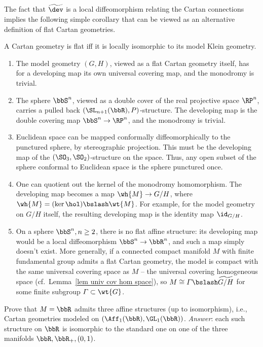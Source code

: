 The fact that $\widetilde{\dev}$ is a local diffeomorphism relating the Cartan connections implies the following simple corollary that can be viewed as an alternative definition of flat Cartan geometries.

\begin{cor}
    A Cartan geometry is flat iff it is locally isomorphic to its model Klein geometry.
\end{cor}

\begin{example}
    \begin{enumerate}
        \item The model geometry $(G,H)$, viewed as a flat Cartan geometry itself, has for a developing map its own universal covering map, and the monodromy is trivial.
        \item The sphere $\bbS^n$, viewed as a double cover of the real projective space $\RP^n$, carries a pulled back $(\SL_{n+1}(\bbR),P)$-structure. The developing map is the double covering map $\bbS^n\to \RP^n$, and the monodromy is trivial.
        \item Euclidean space can be mapped conformally diffeomorphically to the punctured sphere, by stereographic projection. This must be the developing map of the $(\SO_3,\SO_2)$-structure on the space. Thus, any open subset of the sphere conformal to Euclidean space is the sphere punctured once.
        \item One can quotient out the kernel of the monodromy homomorphism. The developing map becomes a map $\wh{M}\to G\slash H$, where $\wh{M}=(\ker\hol)\bslash \wt{M}$. For example, for the model geometry on $G\slash H$ itself, the resulting developing map is the identity map $\id_{G\slash H}$.
        \item On a sphere $\bbS^n,n\geq 2$, there is no flat affine structure: its developing map would be a local diffeomorphism $\bbS^n\to \bbR^n$, and such a map simply doesn't exist. More generally, if a connected compact manifold $M$ with finite fundamental group admits a flat Cartan geometry, the model is compact with the same universal covering space as $M$ -- the  universal covering homogeneous space (cf.\ Lemma~\ref{lem univ cov hom space}), so $M\cong \varGamma\bslash \widetilde{G\slash H}$ for some finite subgroup $\varGamma\subset \wt{G}$.
    \end{enumerate}
\end{example}

\begin{xca}
    Prove that $M=\bbR$ admits three affine structures (up to isomorphism), i.e., Cartan geometries modeled on $(\Aff_1(\bbR),\GL_1(\bbR))$. \emph{Answer}: each such structure on $\bbR$ is isomorphic to the standard one on one of the three manifolds $\bbR,\bbR_+,(0,1)$.
\end{xca}

